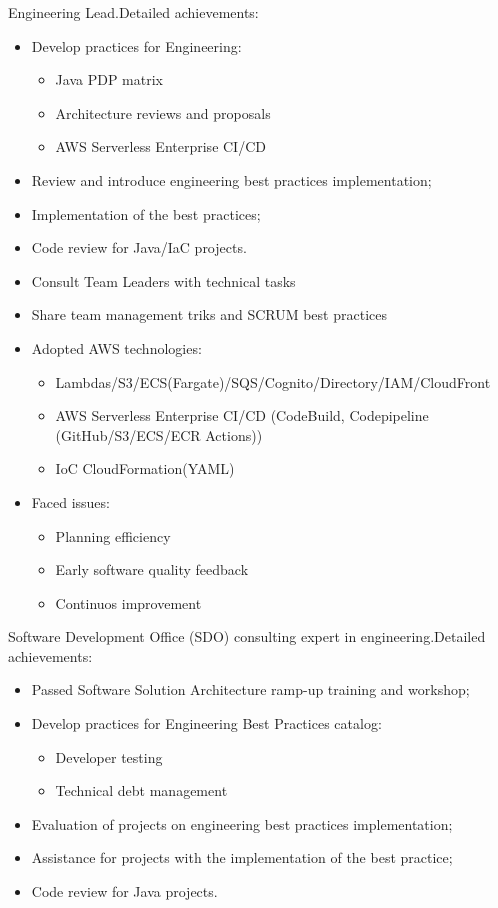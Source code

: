 \documentclass[11pt, a4paper]{moderncv}
\begin{document}
{\begin{itemize}
{Engineering Lead.\newline{}Detailed achievements:
\begin{itemize}
\item Develop practices for Engineering:
\begin{itemize}
\item Java PDP matrix
\item Architecture reviews and proposals
\item AWS Serverless Enterprise CI/CD
\end{itemize}
\item Review and introduce engineering best practices implementation;
\item Implementation of the best practices;
\item Code review for Java/IaC projects.
\item Consult Team Leaders with technical tasks
\item Share team management triks and SCRUM best practices
\item Adopted AWS technologies:
\begin{itemize}
\item Lambdas/S3/ECS(Fargate)/SQS/Cognito/Directory/IAM/CloudFront
\item AWS Serverless Enterprise CI/CD (CodeBuild, Codepipeline (GitHub/S3/ECS/ECR Actions))
\item IoC CloudFormation(YAML)
\end{itemize}
\item Faced issues:
\begin{itemize}
\item Planning efficiency
\item Early software quality feedback
\item Continuos improvement
\end{itemize}
\end{itemize}}

{Software Development Office (SDO) consulting expert in engineering.\newline{}Detailed achievements:
\begin{itemize}
\item Passed Software Solution Architecture ramp-up training and workshop;
\item Develop practices for Engineering Best Practices catalog:
\begin{itemize}
\item Developer testing
\item Technical debt management
\end{itemize}
\item Evaluation of projects on engineering best practices implementation;
\item Assistance for projects with the implementation of the best practice;
\item Code review for Java projects.
\end{itemize}}


\end{itemize}}
\end{document}
